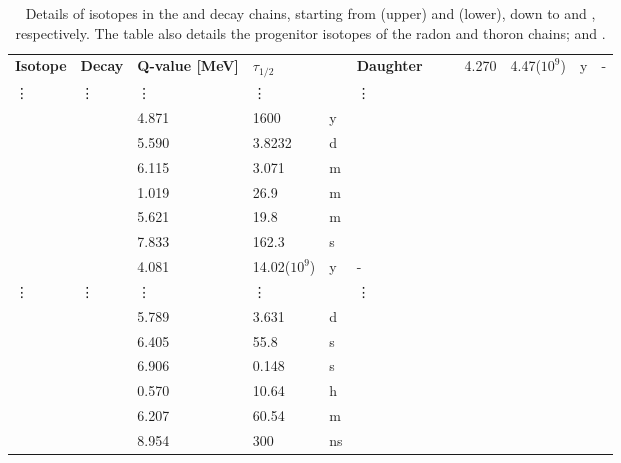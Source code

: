 \begin{table}[h]
\centering
\caption{Details of isotopes in the \RnTTT{} and \RnTTZ{} decay chains, starting from \RaTTS{} (upper) and \RaTTF{} (lower), down to \PoTOF{} and \PoTOT{}, respectively. The table also details the progenitor isotopes of the radon and thoron chains; \UTTE{} and \ThTTT{}.}
\label{tab:radon_decay_chains}
\vspace{1mm}
\renewcommand{\arraystretch}{1.2}
    \begin{tabularx}{1.0\textwidth}{@{\extracolsep{\fill}}llllll}
    \toprule
    
    \textbf{Isotope} & %
    \textbf{Decay} & %
    \textbf{Q-value [MeV]} & %
    \textbf{$\tau_{1/2}$} & %
    & %
    \textbf{Daughter} & %
    
    \hline
    \hline
    
    \UTTE{}	    & \alpha{}      & 4.270     & 4.47($10^{9}$)  & y     & - \\ 
    \vdots      & \vdots        & \vdots    & \vdots          &       & \vdots \\ 
    \RaTTS{}	& \alpha{}      & 4.871     & 1600            & y     & \RnTTT{} \\ 
    \RnTTT{}	& \alpha{}      & 5.590     & 3.8232          & d     & \PoTOE{} \\ 
    \PoTOE{}	& \alpha{}      & 6.115     & 3.071           & m     & \PbTOF{} \\
    \PbTOF{}	& \beta{}       & 1.019     & 26.9            & m     & \BiTOF{} \\
    \BiTOF{}	& \beta{}       & 5.621     & 19.8            & m     & \PoTOF{} \\
    \PoTOF{}	& \alpha{}      & 7.833     & 162.3           & \micro{}s  & \PbTOZ{} \\
    
    \hline
    \hline
    
    \ThTTT{}	& \alpha{}      & 4.081     & 14.02($10^{9}$)   & y     & - \\ 
    \vdots      & \vdots        & \vdots    & \vdots            &       & \vdots \\ 
    \RaTTF{}	& \alpha{}      & 5.789     & 3.631             & d     & \RnTTZ{} \\ 
    \RnTTZ{}	& \alpha{}      & 6.405     & 55.8              & s     & \PoTOS{} \\ 
    \PoTOS{}	& \alpha{}      & 6.906     & 0.148             & s     & \PbTOT{} \\
    \PbTOT{}	& \beta{}       & 0.570     & 10.64             & h     & \BiTOT{} \\
    \BiTOT{}	& \beta{}       & 6.207     & 60.54             & m     & \PoTOT{} \\
    \PoTOT{}	& \alpha{}      & 8.954     & 300               & ns    & \PbTZE{} \\
    
    \bottomrule
    \end{tabularx}
\end{table}

